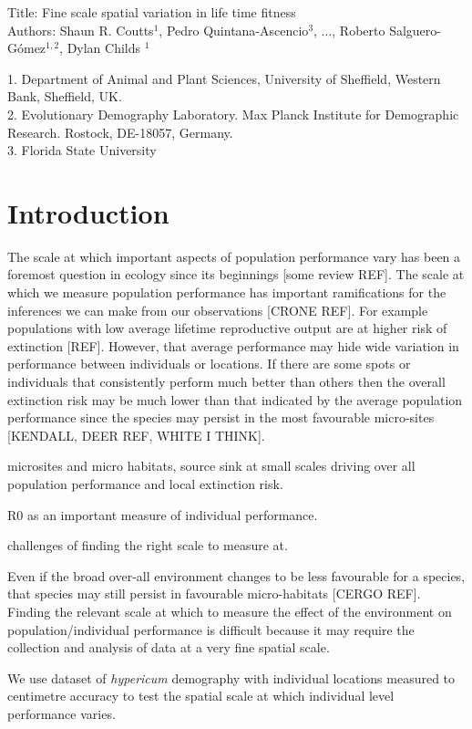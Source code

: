 \documentclass[12pt,a4paper]{article}
\begin{document}
\linenumbers

Title: Fine scale spatial variation in life time fitness\\
Authors: Shaun R. Coutts$^{1}$, Pedro Quintana-Ascencio$^{3}$, ..., Roberto Salguero-G\'omez$^{1,2}$, Dylan Childs $^{1}$

1. Department of Animal and Plant Sciences, University of Sheffield, Western Bank, Sheffield, UK.\\
2. Evolutionary Demography Laboratory. Max Planck Institute for Demographic Research. Rostock, DE-18057, Germany.\\
3. Florida State University

\section*{Introduction}
The scale at which important aspects of population performance vary has been a foremost question in ecology since its beginnings [some review REF]. The scale at which we measure population performance has important ramifications for the inferences we can make from our observations [CRONE REF]. For example populations with low average lifetime reproductive output are at higher risk of extinction [REF]. However, that average performance may hide wide variation in performance between individuals or locations. If there are some spots or individuals that consistently perform much better than others then the overall extinction risk may be much lower than that indicated by the average population performance since the species may persist in the most favourable micro-sites [KENDALL, DEER REF, WHITE I THINK].     

microsites and micro habitats, source sink at small scales driving over all population performance and local extinction risk.    

R0 as an important measure of individual performance. 

challenges of finding the right scale to measure at.

Even if the broad over-all environment changes to be less favourable for a species, that species may still persist in favourable micro-habitats [CERGO REF]. Finding the relevant scale at which to measure the effect of the environment on population/individual performance is difficult because it may require the collection and analysis of data at a very fine spatial scale.

We use dataset of \textit{hypericum} demography with individual locations measured to centimetre accuracy to test the spatial scale at which individual level performance varies. 
\end{document}
